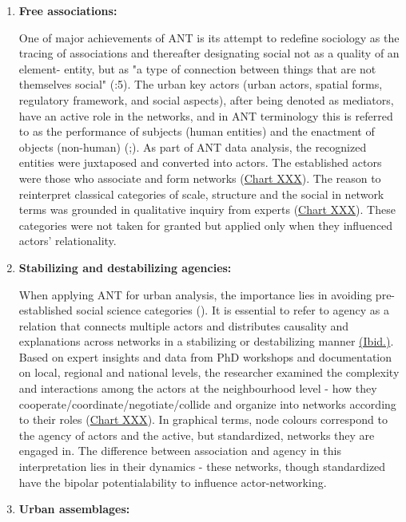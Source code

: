 \documentclass[11pt]{report}
\begin{document}
\begin{enumerate}
\item \textbf{Free associations:}

One of major achievements of ANT is its attempt to redefine sociology as the tracing of associations and thereafter designating social not as a quality of an element- entity, but as "a type of connection between things that are not themselves social"  (\href{Latour}{\citealt{latour_science_2005}}:5).
The urban key actors (urban actors, spatial forms, regulatory framework, and social aspects), after being denoted as mediators, have an active role in the networks, and in ANT terminology this is referred to as the performance of subjects (human entities) and the enactment of objects (non-human) (\href{Callon}{\citealt{callon_elements_1986}};\href{Farias}{\citealt{farias_introduction:_2011}}). As part of ANT data analysis, the recognized entities were juxtaposed and converted into actors.  The established actors were those who associate and form networks (\href{Table ANT discource analysos}{Chart XXX}). The reason to reinterpret classical categories of scale, structure and the social in network terms was grounded in qualitative inquiry from experts (\href{Table data sources}{Chart XXX}). These categories were not taken for granted but applied only when they influenced actors’ relationality.

\item \textbf{Stabilizing and destabilizing agencies:}

When applying ANT for urban analysis, the importance lies in avoiding pre-established social science categories (\href{Farias}{\citealt{farias_introduction:_2011}}). It is essential to refer to agency as a relation that connects multiple actors and distributes causality and explanations across networks in a stabilizing or destabilizing manner  \href{ref}{(Ibid.)}. 
Based on expert insights and data from PhD workshops and documentation on local, regional and national levels, the researcher examined the complexity and interactions among the actors at the neighbourhood level - how they cooperate/coordinate/negotiate/collide and organize into networks according to their roles (\href{Table ANT discource analysos}{Chart XXX}). In graphical terms, node colours correspond to the agency of actors and the active, but standardized, networks they are engaged in. The difference between association and agency in this interpretation lies in their dynamics - these networks, though standardized have the bipolar potentialability to influence actor-networking.

\item \textbf{Urban assemblages:}


\end{enumerate}
\end{document}

